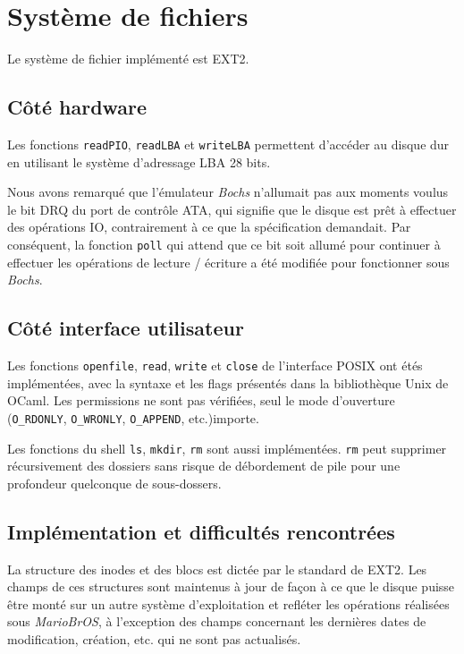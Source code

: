 \documentclass[a4paper, 10pt, french]{article}
\newcommand{\foreign}[1]{\emph{#1}}
\newcommand{\mariobros}{\foreign{MarioBrOS}}
\begin{document}
\clearpage
\section{Système de fichiers}

	Le système de fichier implémenté est EXT2.
	
	\subsection{Côté hardware}
	
		Les fonctions \verb|readPIO|, \verb|readLBA| et \verb|writeLBA| 
permettent d'accéder au disque dur en utilisant le système d'adressage LBA 28 
bits.
		
		Nous avons remarqué que l'émulateur \foreign{Bochs} n'allumait 
pas aux moments voulus le bit DRQ du port de contrôle ATA, qui signifie que le 
disque est prêt à effectuer des opérations IO, contrairement à ce que la 
spécification demandait. Par conséquent, la fonction \verb|poll| qui attend que 
ce bit soit allumé pour continuer à effectuer les opérations de lecture / 
écriture a été modifiée pour fonctionner sous \foreign{Bochs}.
	
	\subsection{Côté interface utilisateur}
	
		Les fonctions \verb|openfile|, \verb|read|, \verb|write| et 
\verb|close| de l'interface POSIX ont étés implémentées, avec la syntaxe et les 
flags présentés dans la bibliothèque Unix de OCaml. Les permissions ne sont pas 
vérifiées, seul le mode d'ouverture (\verb|O_RDONLY|, \verb|O_WRONLY|, 
\verb|O_APPEND|, etc.)importe.
		
		Les fonctions du shell \verb|ls|, \verb|mkdir|, \verb|rm| sont 
aussi implémentées. \verb|rm| peut supprimer récursivement des dossiers sans 
risque de débordement de pile pour une profondeur quelconque de sous-dossers.
		
	\subsection{Implémentation et difficultés rencontrées}
	
		La structure des inodes et des blocs est dictée par le standard 
de EXT2. Les champs de ces structures sont maintenus à jour de façon à ce que le 
disque puisse être monté sur un autre système d'exploitation et refléter les 
opérations réalisées sous \mariobros, à l'exception des champs concernant les 
dernières dates de modification, création, etc. qui ne sont pas actualisés.
		
\end{document}
